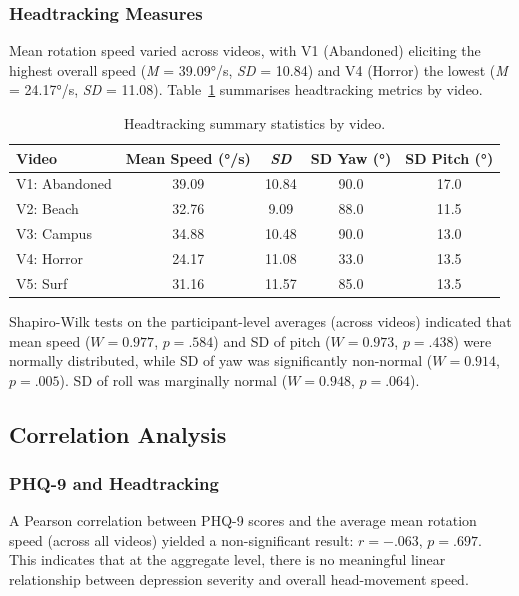\documentclass[12pt]{article}
\begin{document}
\subsubsection{Headtracking Measures}

Mean rotation speed varied across videos, with V1 (Abandoned) eliciting the highest overall speed (\emph{M} = 39.09°/s, \emph{SD} = 10.84) and V4 (Horror) the lowest (\emph{M} = 24.17°/s, \emph{SD} = 11.08). Table~\ref{tab:ht} summarises headtracking metrics by video.

\begin{table}[H]
\centering
\caption{Headtracking summary statistics by video.}
\label{tab:ht}
\begin{tabular}{lcccc}
\toprule
Video          & Mean Speed (°/s) & \emph{SD} & SD Yaw (°) & SD Pitch (°) \\
\midrule
V1: Abandoned  & 39.09 & 10.84 & 90.0 & 17.0 \\
V2: Beach      & 32.76 & 9.09  & 88.0 & 11.5 \\
V3: Campus     & 34.88 & 10.48 & 90.0 & 13.0 \\
V4: Horror     & 24.17 & 11.08 & 33.0 & 13.5 \\
V5: Surf       & 31.16 & 11.57 & 85.0 & 13.5 \\
\bottomrule
\end{tabular}
\end{table}

Shapiro-Wilk tests on the participant-level averages (across videos) indicated that mean speed ($W = 0.977$, $p = .584$) and SD of pitch ($W = 0.973$, $p = .438$) were normally distributed, while SD of yaw was significantly non-normal ($W = 0.914$, $p = .005$). SD of roll was marginally normal ($W = 0.948$, $p = .064$).


\subsection{Correlation Analysis}

\subsubsection{PHQ-9 and Headtracking}

A Pearson correlation between PHQ-9 scores and the average mean rotation speed (across all videos) yielded a non-significant result: $r = -.063$, $p = .697$. This indicates that at the aggregate level, there is no meaningful linear relationship between depression severity and overall head-movement speed.
\end{document}
